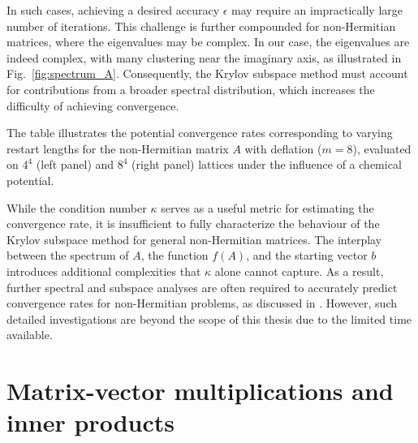 In such cases, achieving a desired accuracy $ \epsilon $ may require an impractically large number of iterations. This challenge is further compounded for non-Hermitian matrices, where the eigenvalues may be complex. In our case, the eigenvalues are indeed complex, with many clustering near the imaginary axis, as illustrated in Fig.~\ref{fig:spectrum_A}. Consequently, the Krylov subspace method must account for contributions from a broader spectral distribution, which increases the difficulty of achieving convergence.

\begin{table}[H]
    \centering
    \begin{minipage}{0.45\textwidth}
        \centering
    \end{minipage}
    \hspace{0.02\textwidth} %
    \begin{minipage}{0.45\textwidth}
        \centering
        
    \end{minipage}
    \caption{\small The table illustrates the potential convergence rates corresponding to varying restart lengths for the non-Hermitian matrix $A$ with deflation ($m=8$), evaluated on $4^4$ (left panel) and $8^4$ (right panel) lattices under the influence of a chemical potential.}
    \label{tab:convergence_rate_m_8} %
\end{table}

While the condition number $ \kappa $ serves as a useful metric for estimating the convergence rate, it is insufficient to fully characterize the behaviour of the Krylov subspace method for general non-Hermitian matrices. The interplay between the spectrum of $ A $, the function $ f(A) $, and the starting vector $ b $ introduces additional complexities that $ \kappa $ alone cannot capture. As a result, further spectral and subspace analyses are often required to accurately predict convergence rates for non-Hermitian problems, as discussed in \cite{38}. However, such detailed investigations are beyond the scope of this thesis due to the limited time available.

\section{Matrix-vector multiplications and inner products}
\label{sec:mvms_and_inner_pdt}

